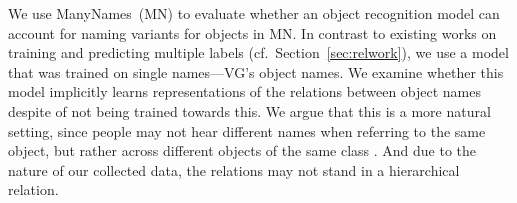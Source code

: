 %
%
We use ManyNames\ (MN) to evaluate whether an object recognition model can account for naming variants for objects in MN.
In contrast to existing works on training and predicting multiple labels
(cf.\ Section\ \ref{sec:relwork}), we use a model that was trained on single names---VG's object names. %
We examine whether this model implicitly learns representations of the relations between object names despite of not being trained towards this. 
We argue that this is a more natural setting, since people may not hear different names when referring to the same object, but rather across different objects of the same class \cite{frank2009using}.
And due to the nature of our collected data, the relations may not stand in a hierarchical relation. 


